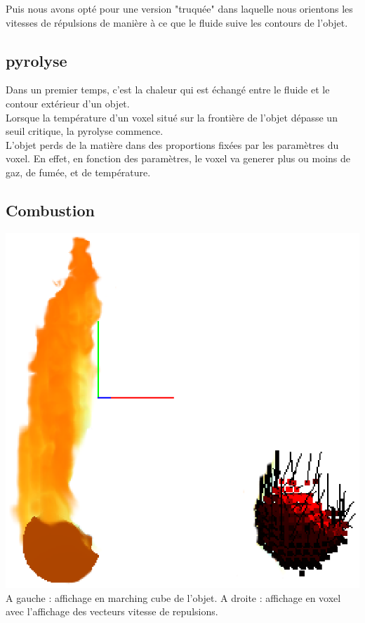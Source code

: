 \documentclass[a4paper,10pt]{article}
\begin{document}
Puis nous avons opté pour une version "truquée" dans laquelle nous
orientons les vitesses de répulsions de manière à ce que le fluide
suive les contours de l'objet. \\


\subsection{pyrolyse}
Dans un premier temps, c'est la chaleur qui est échangé entre le
fluide et le contour extérieur d'un objet.\\ Lorsque la température
d'un voxel situé sur la frontière de l'objet dépasse un seuil
critique, la pyrolyse commence. \\ L'objet perds de la matière dans
des proportions fixées par les paramètres du voxel.  En effet, en
fonction des paramètres, le voxel va generer plus ou moins de gaz, de
fumée, et de température.

\subsection{Combustion}

\begin{center}
  \includegraphics[scale=1]{Decomposition.ps}\\
  A gauche : affichage en marching cube de l'objet. A droite : affichage en voxel avec l'affichage des vecteurs vitesse de repulsions.\\
\end{center}
    
\end{document}
